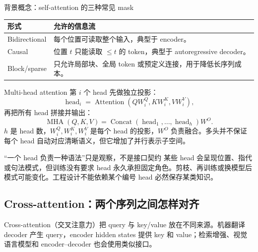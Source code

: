 
\begin{knowledgebox}{背景概念：self-attention 的三种常见 mask}
\begin{tabularx}{\textwidth}{L{0.23\textwidth} X}
\toprule
形式 & 允许的信息流 \\
\midrule
Bidirectional & 每个位置可读取整个输入，典型于 encoder。 \\
Causal & 位置 $t$ 只能读取 $\le t$ 的 token，典型于 autoregressive decoder。 \\
Block/sparse & 只允许局部块、全局 token 或预定义连接，用于降低长序列成本。 \\
\bottomrule
\end{tabularx}
\end{knowledgebox}


\begin{importantbox}{Multi-head attention}
第 $i$ 个 head 先做独立投影：
\[
\operatorname{head}_i=\operatorname{Attention}(QW_i^Q,KW_i^K,VW_i^V),
\]
再把所有 head 拼接并输出：
\[
\operatorname{MHA}(Q,K,V)=\operatorname{Concat}(\operatorname{head}_1,\ldots,\operatorname{head}_h)W^O.
\]
$h$ 是 head 数，$W_i^Q,W_i^K,W_i^V$ 是每个 head 的投影，$W^O$ 负责融合。多头并不保证每个 head 自动对应清晰语义，但它增加了并行表示子空间。
\end{importantbox}


\begin{warningbox}{“一个 head 负责一种语法”只是观察，不是接口契约}
某些 head 会呈现位置、指代或句法模式，但训练没有要求 head 永久承担固定角色。剪枝、再训练或换模型后模式可能变化。工程设计不能依赖某个编号 head 必然保存某类知识。
\end{warningbox}

\subsection{Cross-attention：两个序列之间怎样对齐}

Cross-attention（交叉注意力）把 query 与 key/value 放在不同来源。机器翻译 decoder 产生 query，encoder hidden states 提供 key 和 value；检索增强、视觉语言模型和 encoder--decoder 也会使用类似接口。

